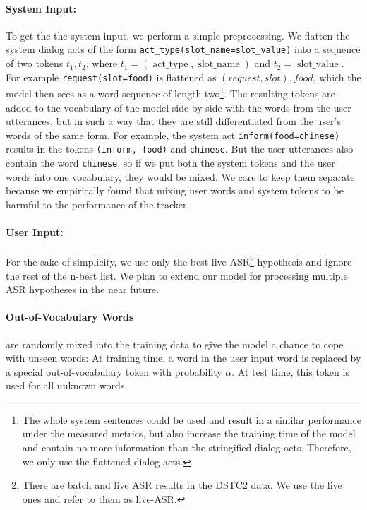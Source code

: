 \documentclass[runningheads,a4paper]{llncs}
\begin{document}
\paragraph*{System Input:}
To get the the system input, we perform a simple preprocessing. We flatten the system dialog acts of the form \texttt{act\_type(slot\_name=slot\_value)} into a sequence of two tokens $t_1, t_2$, where $t_1=(\operatorname{act\_type}, \operatorname{slot\_name})$ and $t_2=\operatorname{slot\_value}$. For example \texttt{request(slot=food)} is flattened as $(request, slot), food$, which the model then sees as a word sequence of length two\footnote{The whole system sentences could be used and result in a similar performance under the measured metrics, but also increase the training time of the model and contain no more information than the stringified dialog acts. Therefore, we only use the flattened dialog acts.}. The resulting tokens are added to the vocabulary of the model side by side with the words from the user utterances, but in such a way that they are still differentiated from the user's words of the same form. For example, the system act \texttt{inform(food=chinese)} results in the tokens \texttt{(inform, food)} and \texttt{chinese}. But the user utterances also contain the word \texttt{chinese}, so if we put both the system tokens and the user words into one vocabulary, they would be mixed. We care to keep them separate because we empirically found that mixing user words and system tokens to be harmful to the performance of the tracker.

\paragraph*{User Input:}
For the sake of simplicity, we use only the best live-ASR\footnote{There are batch and live ASR results in the DSTC2 data. We use the live ones and refer to them as live-ASR.} hypothesis and ignore the rest of the n-best list.
We plan to extend our model for processing multiple ASR hypotheses in the near future.

\paragraph*{Out-of-Vocabulary Words}
are randomly mixed into the training data to give the model a chance to cope with unseen words: At training time, a word in the user input word is replaced by a special out-of-vocabulary token with probability $\alpha$. At test time, this token is used for all unknown words.
\end{document}
